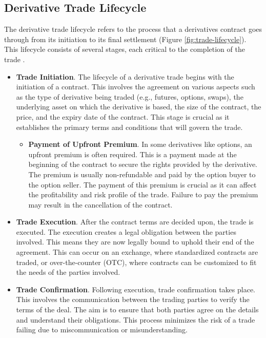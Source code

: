 \subsection{Derivative Trade Lifecycle}
\label{sec:derivative_trade_lifecycle}

The derivative trade lifecycle refers to the process that a derivatives contract goes through from its initiation to its final settlement (Figure \ref{fig:trade-lifecycle}). This lifecycle consists of several stages, each critical to the completion of the trade \citep{isda_market_infrastructure}.

\begin{itemize}
    \item \textbf{Trade Initiation}. The lifecycle of a derivative trade begins with the initiation of a contract. This involves the agreement on various aspects such as the type of derivative being traded (e.g., futures, options, swaps), the underlying asset on which the derivative is based, the size of the contract, the price, and the expiry date of the contract. This stage is crucial as it establishes the primary terms and conditions that will govern the trade.

    \begin{itemize}
        \item \textbf{Payment of Upfront Premium}. In some derivatives like options, an upfront premium is often required. This is a payment made at the beginning of the contract to secure the rights provided by the derivative. The premium is usually non-refundable and paid by the option buyer to the option seller. The payment of this premium is crucial as it can affect the profitability and risk profile of the trade. Failure to pay the premium may result in the cancellation of the contract.
    \end{itemize}

    \item \textbf{Trade Execution}. After the contract terms are decided upon, the trade is executed. The execution creates a legal obligation between the parties involved. This means they are now legally bound to uphold their end of the agreement. This can occur on an exchange, where standardized contracts are traded, or over-the-counter (OTC), where contracts can be customized to fit the needs of the parties involved.

    \item \textbf{Trade Confirmation}. Following execution, trade confirmation takes place. This involves the communication between the trading parties to verify the terms of the deal. The aim is to ensure that both parties agree on the details and understand their obligations. This process minimizes the risk of a trade failing due to miscommunication or misunderstanding.
    

\end{itemize}
